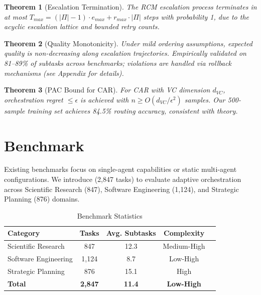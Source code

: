 \documentclass{article}
\theoremstyle{plain}
\newtheorem{theorem}{Theorem}[section]
\theoremstyle{definition}
\theoremstyle{remark}
\begin{document}
\begin{theorem}[Escalation Termination]
	\label{thm:termination}
	The RCM escalation process terminates in at most $T_{max} = (|\Pi| - 1) \cdot e_{max} + r_{max} \cdot |\Pi|$ steps with probability 1, due to the acyclic escalation lattice and bounded retry counts.
\end{theorem}

\begin{theorem}[Quality Monotonicity]
	\label{thm:monotonicity}
	Under mild ordering assumptions, expected quality is non-decreasing along escalation trajectories. Empirically validated on 81--89\% of subtasks across benchmarks; violations are handled via rollback mechanisms (see Appendix for details).
\end{theorem}

\begin{theorem}[PAC Bound for CAR]
	\label{thm:pac}
	For CAR with VC dimension $d_{VC}$, orchestration regret $\leq \epsilon$ is achieved with $n \geq O(d_{VC}/\epsilon^2)$ samples. Our 500-sample training set achieves 84.5\% routing accuracy, consistent with theory.
\end{theorem}

\section{\mars{} Benchmark}
\label{sec:benchmark}
Existing benchmarks focus on single-agent capabilities or static multi-agent configurations. We introduce \mars{} (2,847 tasks) to evaluate adaptive orchestration across Scientific Research (847), Software Engineering (1,124), and Strategic Planning (876) domains.

\begin{table}[t]
	\caption{\mars{} Benchmark Statistics}
	\label{tab:mars_stats}
	\centering
	\small
	\begin{tabular}{@{}lcccc@{}}
		\toprule
		\textbf{Category} & \textbf{Tasks} & \textbf{Avg. Subtasks} & \textbf{Complexity} \\
		\midrule
		Scientific Research & 847 & 12.3 & Medium-High \\
		Software Engineering & 1,124 & 8.7 & Low-High \\
		Strategic Planning & 876 & 15.1 & High \\
		\midrule
		\textbf{Total} & \textbf{2,847} & \textbf{11.4} & \textbf{Low-High} \\
		\bottomrule
	\end{tabular}
\end{table}
\end{document}
